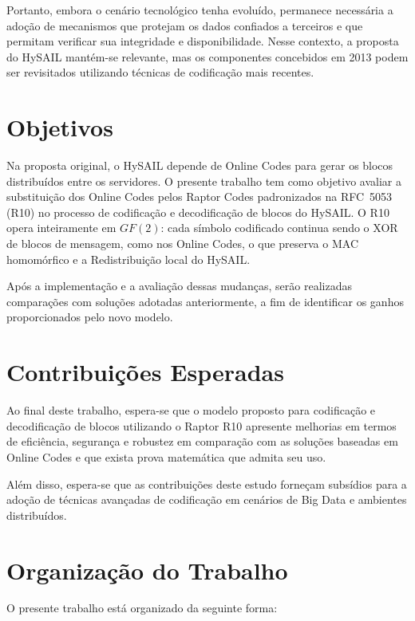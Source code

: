 Portanto, embora o cenário tecnológico tenha evoluído, permanece necessária a adoção de mecanismos que protejam os dados confiados a terceiros e que permitam verificar sua integridade e disponibilidade. Nesse contexto, a proposta do HySAIL mantém-se relevante, mas os componentes concebidos em 2013 podem ser revisitados utilizando técnicas de codificação mais recentes.

\section{Objetivos}

Na proposta original, o HySAIL depende de Online Codes para gerar os blocos distribuídos entre os servidores. O presente trabalho tem como objetivo avaliar a substituição dos Online Codes pelos Raptor Codes padronizados na RFC~5053 (R10) \cite{luby2007rfc5053} no processo de codificação e decodificação de blocos do HySAIL. O R10 opera inteiramente em $GF(2)$: cada símbolo codificado continua sendo o XOR de blocos de mensagem, como nos Online Codes, o que preserva o \acrshort{MAC} homomórfico e a Redistribuição local do HySAIL.

Após a implementação e a avaliação dessas mudanças, serão realizadas comparações com soluções adotadas anteriormente, a fim de identificar os ganhos proporcionados pelo novo modelo.

\section{Contribuições Esperadas}

Ao final deste trabalho, espera-se que o modelo proposto para codificação e decodificação de blocos utilizando o Raptor R10 apresente melhorias em termos de eficiência, segurança e robustez em comparação com as soluções baseadas em Online Codes e que exista prova matemática que admita seu uso.

Além disso, espera-se que as contribuições deste estudo forneçam subsídios para a adoção de técnicas avançadas de codificação em cenários de Big Data e ambientes distribuídos.

\section{Organização do Trabalho}

O presente trabalho está organizado da seguinte forma:

